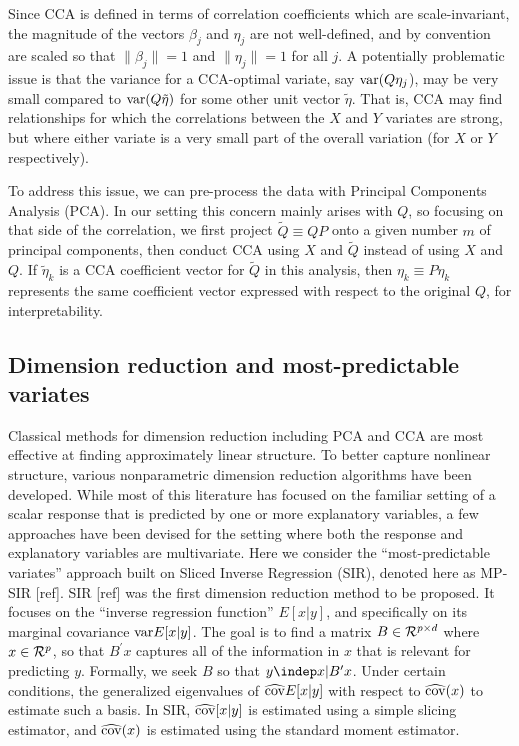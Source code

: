 Since CCA is defined in terms of correlation coefficients which are
scale-invariant, the magnitude of the vectors $\beta_j$ and $\eta_j$
are not well-defined, and by convention are scaled so that $\|\beta_j\|
= 1$ and $\|\eta_j\| = 1$ for all $j$.  A potentially problematic issue
is that the variance for a CCA-optimal variate, say ${\rm var}(Q\eta_j$),
may be very small compared to ${\rm var}(Q\tilde{\eta})$ for some other
unit vector $\tilde{\eta}$.  That is, CCA may find relationships for
which the correlations between the $X$ and $Y$ variates are strong,
but where either variate is a very small part of the overall variation
(for $X$ or $Y$ respectively).

To address this issue, we can pre-process the data with Principal
Components Analysis (PCA).  In our setting this concern mainly arises
with $Q$, so focusing on that side of the correlation, we first project
$\tilde{Q} \equiv QP$ onto a given number $m$ of principal components,
then conduct CCA using $X$ and $\tilde{Q}$ instead of using $X$ and $Q$.
If $\tilde{\eta}_k$ is a CCA coefficient vector for $\tilde{Q}$ in this
analysis, then $\eta_k \equiv P\eta_k$ represents the same coefficient
vector expressed with respect to the original $Q$, for interpretability.

\subsection{Dimension reduction and most-predictable variates}

Classical methods for dimension reduction including PCA and CCA are most
effective at finding approximately linear structure.  To better capture
nonlinear structure, various nonparametric dimension reduction algorithms
have been developed.  While most of this literature has focused on the
familiar setting of a scalar response that is predicted by one or more
explanatory variables, a few approaches have been devised for the setting
where both the response and explanatory variables are multivariate.
Here we consider the ``most-predictable variates'' approach built on
Sliced Inverse Regression (SIR), denoted here as MP-SIR [ref].  SIR [ref]
was the first dimension reduction method to be proposed.  It focuses
on the ``inverse regression function'' $E[x|y]$, and specifically
on its marginal covariance ${\rm var}E[x|y]$.  The goal is to find a
matrix $B \in {\cal R}^{p\times d}$ where $x\in {\cal R}^p$, so that
$B^\prime x$ captures all of the information in $x$ that is relevant for
predicting $y$.  Formally, we seek $B$ so that $y \indep x | B^\prime x$.
Under certain conditions, the generalized eigenvalues of $\widehat{\rm
cov}E[x | y]$ with respect to $\widehat{\rm cov}(x)$ to estimate such
a basis.  In SIR, $\widehat{\rm cov}[x | y]$ is estimated using a simple
slicing estimator, and $\widehat{\rm cov}(x)$ is estimated using the
standard moment estimator.

